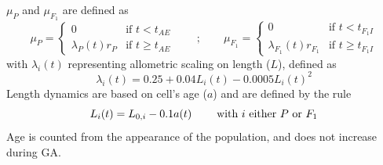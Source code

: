 \documentclass[a4paper,oneside]{article}
\begin{document}
    $\mu_{P}$ and $\mu_{F_{1}}$ are defined as
    \[
      \mu_{P} =
        \begin{cases}
          0                    & \mbox{if } t <    t_{AE} \\
          \lambda_{P}(t) r_{P} & \mbox{if } t \geq t_{AE}
        \end{cases}
      \qquad;\qquad
      \mu_{F_{1}} = 
        \begin{cases}
          0                            & \mbox{if } t <    t_{F_{1}I} \\
          \lambda_{F_{1}}(t) r_{F_{1}} & \mbox{if } t \geq t_{F_{1}I}
        \end{cases}
    \]
    with $\lambda_i(t)$ representing allometric scaling on length ($L$), defined as
    \[
      \lambda_{i}(t) = 0.25 + 0.04 L_{i}(t) - 0.0005 L_{i}{(t)}^{2}
    \]
    Length dynamics are based on cell's age ($a$) and are defined by the rule
    \[
      L_{i}(t) = L_{0,i} - 0.1 a(t) \hspace{8mm}\text{with $i$ either $P$ or $F_{1}$}
    \]
    Age is counted from the appearance of the population, and does not increase during GA.\@
\end{document}
